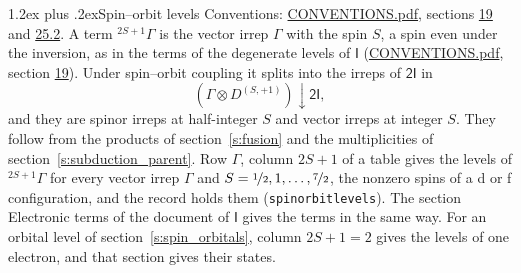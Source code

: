 \documentclass[10pt,a4paper]{article}
\makeatletter
\renewcommand\section{\@startsection{section}{1}{\z@}{-3ex plus -1ex minus -.2ex}%
  {1.2ex plus .2ex}{\normalfont\large\sffamily\bfseries\color{parttitle}}}
\numberwithin{equation}{section}
\newcommand{\grp}[1]{\mathsf{#1}}
\newcommand{\restr}[2]{#1\!\downarrow#2}
\newcommand{\irrJp}[2]{D^{(#1,#2)}}
\newcommand{\irrprod}{\otimes}
\newcommand{\term}[2]{{}^{#1}#2}
\makeatother
\begin{document}
\section{Spin--orbit levels}\label{s:spin_orbit}
Conventions: \href{../../CONVENTIONS.pdf}{CONVENTIONS.pdf}, sections \href{../../../rotation/CONVENTIONS.pdf\#conv.19}{19} and \href{../../CONVENTIONS.pdf\#conv.25.2}{25.2}.
\leavevmode\label{n:local.spin}\label{n:symbol.term}A term $\term{2S+1}{\Gamma}$ is the vector irrep $\Gamma$ with the spin $S$, a spin even under the inversion, as in the terms of the degenerate levels of \href{../../../rotation/data/pdf/I.pdf}{$\grp{I}$} (\href{../../CONVENTIONS.pdf}{CONVENTIONS.pdf}, section \href{../../../rotation/CONVENTIONS.pdf\#conv.19}{19}). Under spin--orbit coupling it splits into the irreps of $\grp{2I}$ in
\begin{equation}\label{e:spinorbit}\restr{(\Gamma \irrprod \irrJp{S}{+1})}{\grp{2I}},\end{equation}
and they are spinor irreps at half-integer $S$ and vector irreps at integer $S$. They follow from the products of section~\ref{s:fusion} and the multiplicities of section~\ref{s:subduction_parent}. Row $\Gamma$, column $2S + 1$ of a table gives the levels of $\term{2S+1}{\Gamma}$ for every vector irrep $\Gamma$ and $S = \nicefrac{1}{2}, 1, \dots, \nicefrac{7}{2}$, the nonzero spins of a d or f configuration, and the record holds them (\texttt{spinorbitlevels}). The section Electronic terms of the document of \href{../../../rotation/data/pdf/I.pdf}{$\grp{I}$} gives the terms in the same way. For an orbital level of section~\ref{s:spin_orbitals}, column $2S + 1 = 2$ gives the levels of one electron, and that section gives their states.
\end{document}
